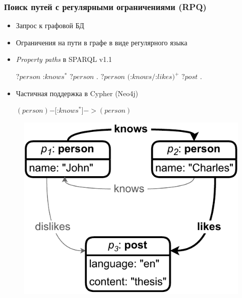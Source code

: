 \documentclass{beamer}
\begin{document}
\begin{frame}[fragile]
  \frametitle{Поиск путей с регулярными ограничениями (RPQ)}
  \noindent\begin{minipage}{0.55\textwidth}
    \begin{itemize}
      \item Запрос к графовой БД
      \item Ограничения на пути в графе в виде регулярного языка
      \item \textit{Property paths} в SPARQL v1.1
            \vspace{2pt}
            \begin{itemize}
              \emptyitem $?person$ :$knows^*$ $?person$ .
              \emptyitem $?person$ $($:$knows/$:$likes)^+$ $?post$ .
            \end{itemize}
            \vspace{2pt}
      \item Частичная поддержка в Cypher (Neo4j)
            \vspace{2pt}
            \begin{itemize}
              \emptyitem $(person)$$-$$[$:$knows^*]$$-$$>$$(person)$
            \end{itemize}
            \vspace{2pt}
    \end{itemize}
  \end{minipage}
  \noindent\begin{minipage}{0.44\textwidth}
    \begin{figure}[h!]
      \includegraphics[width=1\linewidth]{pictures/graphmodel_path.pdf}
    \end{figure}
  \end{minipage}
\end{frame}
\end{document}
